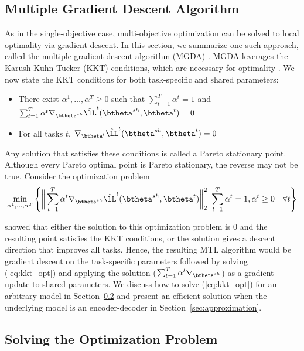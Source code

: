 \subsection{Multiple Gradient Descent Algorithm}
\label{sec:mgda}

As in the single-objective case, multi-objective optimization can be solved to local optimality via gradient descent. In this section, we summarize one such approach, called the multiple gradient descent algorithm (MGDA) \citep{Desideri2012}. MGDA leverages the Karush-Kuhn-Tucker (KKT) conditions, which are necessary for optimality \citep{Fliege2000,Schaffler2002,Desideri2012}. We now state the KKT conditions for both task-specific and shared parameters:
\begin{itemize}[itemsep=0pt,topsep=0pt]
\item There exist $\alpha^1,\ldots, \alpha^T \geq 0$ such that $\sum_{t=1}^T\alpha^t = 1$ and $\sum_{t=1}^T \alpha^t \nabla_{\btheta^{sh}}  \hat{\lL}^t(\btheta^{sh},\btheta^t) = 0$
\item For all tasks $t$,  $\nabla_{\btheta^{t}}  \hat{\lL}^t(\btheta^{sh},\btheta^t) = 0$
\end{itemize}
Any solution that satisfies these conditions is called a Pareto stationary point. Although every Pareto optimal point is Pareto stationary, the reverse may not be true. Consider the optimization problem
\begin{equation}
\min_{\alpha^1,\ldots,\alpha^T}  \Bigg\{  \bigg\| \sum_{t=1}^T \alpha^t \nabla_{\btheta^{sh}}  \hat{\lL}^t(\btheta^{sh},\btheta^t) \bigg\|_2^2 \bigg |  \sum_{t=1}^T \alpha^t = 1, \alpha^t \geq 0 \quad \forall t \Bigg\}
\label{eq:kkt_opt}
\end{equation}

\citet{Desideri2012} showed that either the solution to this optimization problem is $0$ and the resulting point satisfies the KKT conditions, or the solution gives a descent direction that improves all tasks. Hence, the resulting MTL algorithm would be gradient descent on the task-specific parameters followed by solving (\ref{eq:kkt_opt}) and applying the solution ($\sum_{t=1}^T\alpha^t \nabla_{\btheta^{sh}}$) as a gradient update to shared parameters. We discuss how to solve (\ref{eq:kkt_opt}) for an arbitrary model in Section~\ref{sec:optimization} and present an efficient solution when the underlying model is an encoder-decoder in Section~\ref{sec:approximation}.

\subsection{Solving the Optimization Problem}
\label{sec:optimization}

